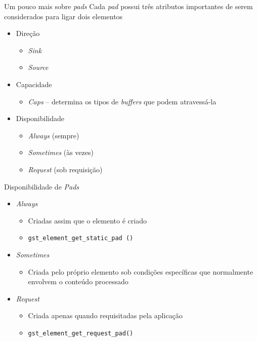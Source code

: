 \documentclass{beamer}
\let\C\lstinline
\def\en#1{\foreignlanguage{english}{\emph{#1}}}
\begin{document}
\begin{frame}[c]{Um pouco mais sobre \en{pads}}
  Cada \en{pad} possui três atributos importantes de serem considerados
  para ligar dois elementos
  \begin{itemize}
    \item<2-> Direção
      \begin{itemize}
        \item \en{Sink}
        \item \en{Source}
      \end{itemize}
    \item<3-> Capacidade
      \begin{itemize}
        \item \en{Caps} -- determina os tipos de \en{buffers} que podem
          atravessá-la
      \end{itemize}
    \item<4-> Disponibilidade
      \begin{itemize}
        \item \en{Always} (sempre)
        \item \en{Sometimes} (às vezes)
        \item \en{Request} (sob requisição)
      \end{itemize}
  \end{itemize}
\end{frame}

\begin{frame}[c]{Disponibilidade de \en{Pads}}
  \begin{itemize}
    \item<1-> \en{Always}
      \begin{itemize}
        \item Criadas assim que o elemento é criado
        \item \C{gst_element_get_static_pad ()}
      \end{itemize}
    \item<2-> \en{Sometimes}
      \begin{itemize}
        \item Criada pelo próprio elemento sob condições específicas que
          normalmente envolvem o conteúdo processado
      \end{itemize}
    \item<3-> \en{Request}
      \begin{itemize}
        \item Criada apenas quando requisitadas pela aplicação
        \item \C{gst_element_get_request_pad()}
      \end{itemize}
  \end{itemize}
\end{frame}
\end{document}
